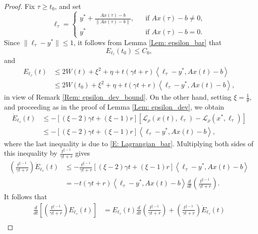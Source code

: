 \documentclass[10pt,a4paper]{amsart}
\begin{document}
\begin{proof}
Fix $\tau\ge t_0$, and set
\begin{equation}\label{E: lambda_tau}
\ell_\tau = \left\{
\begin{array}{ccl}
y^* + \frac{Ax(\tau)-b}{\| Ax(\tau)-b \|},& & \text{if }Ax(\tau)-b\neq 0,\\
y^* & & \text{if }Ax(\tau)-b= 0.
\end{array}
\right.
\end{equation}
Since $\|\ell_\tau-y^*\|\le 1$, it follows from Lemma \ref{Lem: epsilon_bar} that 
$$ E_{\ell_\tau}( t_0) \le C_0,$$
and
\begin{equation}\label{E: E_tau_bound}
\begin{aligned}
E_{\ell_\tau}(t) & \le 2W(t) + \xi^2 + \eta + t(\gamma t + r)\left\langle \ell_\tau - y^*, Ax(t)-b \right\rangle \\
 & \le 2W(t_0) + \xi^2 + \eta + t(\gamma t + r)\left\langle \ell_\tau - y^*, Ax(t)-b \right\rangle,    
\end{aligned}
\end{equation}
in view of Remark \ref{Rem: epsilon_dev_bound}. On the other hand, setting $\xi = \frac{1}{\theta}$, and proceeding as in the proof of Lemma \ref{Lem: epsilon_dev}, we obtain
\begin{align*}
\dot E_{\ell_\tau}(t)  
&\le -[ (\xi-2)\gamma t + (\xi-1)r ] \left[ \mathcal{L}_\rho\left(x(t),\ell_\tau\right) - \mathcal{L}_\rho(x^*,\ell_\tau) \right] \\
&\le -[ (\xi-2)\gamma t + (\xi-1)r ] \left\langle \ell_\tau - y^*, Ax(t)-b \right\rangle,
\end{align*}
where the last inequality is due to \eqref{E: Lagrangian_bar}. Multiplying both sides of this inequality by $\frac{t^{\xi-1}}{\gamma t+r}$ gives
\begin{align*}
\left(\tfrac{t^{\xi-1}}{\gamma t+r}\right)\dot E_{\ell_\tau}(t) 
& \le -\tfrac{t^{\xi-1}}{\gamma t+r}[ (\xi-2)\gamma t + (\xi-1)r ] \left\langle \ell_\tau - y^*, Ax(t)-b \right\rangle \\
& = -t(\gamma t+r) \left\langle \ell_\tau - y^*, Ax(t)-b \right\rangle \frac{d}{dt}\left(\tfrac{t^{\xi-1}}{\gamma t+r}\right).
\end{align*}
It follows that
\begin{align*}
\frac{d}{dt}\left[\left(\tfrac{t^{\xi-1}}{\gamma t+r}\right)E_{\ell_\tau}(t)\right] 
&= E_{\ell_\tau}(t)\frac{d}{dt}\left(\tfrac{t^{\xi-1}}{\gamma t+r}\right) + \left(\tfrac{t^{\xi-1}}{\gamma t+r}\right)\dot E_{\ell_\tau}(t)  \\

\end{align*}
\end{proof}
\end{document}
